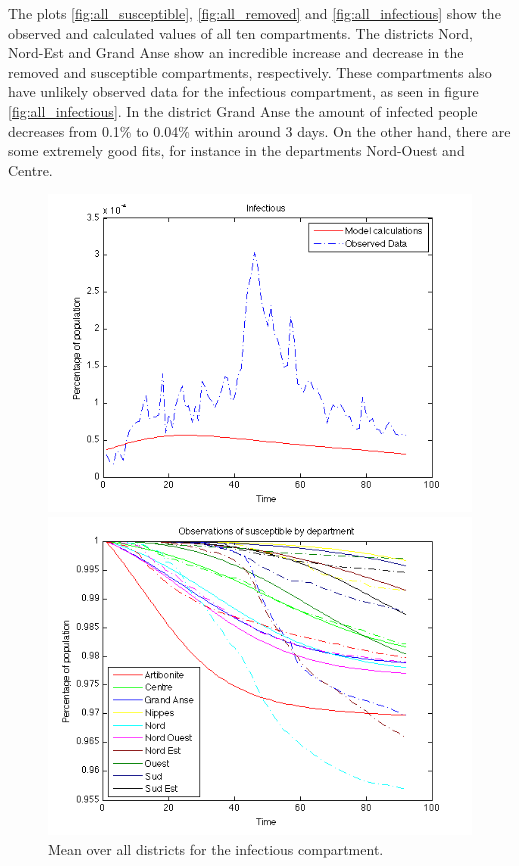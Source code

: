 \documentclass[11pt]{article}
\begin{document}
The plots \ref{fig:all_susceptible}, \ref{fig:all_removed} and \ref{fig:all_infectious} show the observed and calculated values of all ten compartments. The districts Nord, Nord-Est and Grand Anse show an incredible increase and decrease in the removed and susceptible compartments, respectively. These compartments also have unlikely observed data for the infectious compartment, as seen in figure \ref{fig:all_infectious}. In the district Grand Anse the amount of infected people decreases from  0.1\% to 0.04\% within around 3 days. On the other hand, there are some extremely good fits, for instance in the departments Nord-Ouest and Centre. 


\begin{figure}
  \begin{minipage}[t]{0.49\textwidth}
    \centering
    \includegraphics[width=\textwidth]{Bilder/infectious_mean.png} 
    \caption{Mean over all districts for the infectious compartment.}
	\label{fig:mean_infectious}
  \end{minipage}
  \hspace{0.02\textwidth}
  \begin{minipage}[t]{0.49\textwidth}
    \centering
    \includegraphics[width=\textwidth]{Bilder/susceptible.png} 

\end{minipage}
\end{figure}
\end{document}
